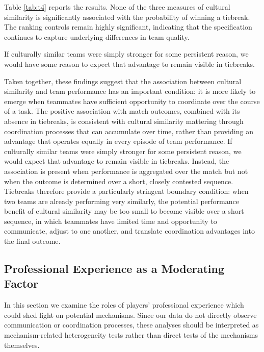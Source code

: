 \documentclass[10pt]{article}
\begin{document}
Table \ref{tab:t4} reports the results. None of the three measures of cultural similarity is significantly associated with the probability of winning a tiebreak.  The ranking controls remain highly significant, indicating that the specification continues to capture underlying differences in team quality.

If culturally similar teams were simply stronger for some persistent reason, we would have some reason to expect that advantage to remain visible in tiebreaks.

Taken together, these findings suggest that the association between cultural similarity and team performance has an important condition: it is more likely to emerge when teammates have sufficient opportunity to coordinate over the course of a task. The positive association with match outcomes, combined with its absence in tiebreaks, is consistent with cultural similarity mattering through coordination processes that can accumulate over time, rather than providing an advantage that operates equally in every episode of team performance. If culturally similar teams were simply stronger for some persistent reason, we would expect that advantage to remain visible in tiebreaks. Instead, the association is present when performance is aggregated over the match but not when the outcome is determined over a short, closely contested sequence. Tiebreaks therefore provide a particularly stringent boundary condition: when two teams are already performing very similarly, the potential performance benefit of cultural similarity may be too small to become visible over a short sequence, in which teammates have limited time and opportunity to communicate, adjust to one another, and translate coordination advantages into the final outcome.





\subsection{Professional Experience as a Moderating Factor}

In this section we examine the roles of players’ professional experience which could shed light on potential mechanisms. Since our data do not directly observe communication or coordination processes, these analyses should be interpreted as mechanism-related heterogeneity tests rather than direct tests of the mechanisms themselves. %
\end{document}
